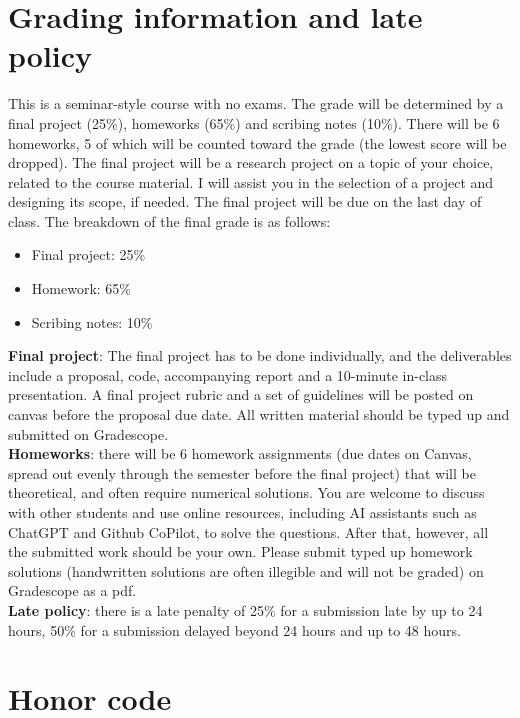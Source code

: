 \documentclass[12pt]{article}
\begin{document}
\section{Grading information and late policy}

This is a seminar-style course with no exams. The grade will be determined by a final project (25\%), homeworks (65\%) and scribing notes (10\%). There will be 6 homeworks, 5 of which will be counted toward the grade (the lowest score will be dropped). The final project will be a research project on a topic of your choice, related to the course material. I will assist you in the selection of a project and designing its scope, if needed. The final project will be due on the last day of class. The breakdown of the final grade is as follows:
\begin{itemize}
	\item Final project: 25\%
	\item Homework: 65\%
	\item Scribing notes: 10\%
\end{itemize}

\textbf{Final project}: The final project has to be done individually, and the deliverables include a proposal, code, accompanying report and a 10-minute in-class presentation. A final project rubric and a set of guidelines will be posted on canvas before the proposal due date. All written material should be typed up and submitted on Gradescope.\\

\textbf{Homeworks}: there will be 6 homework assignments (due dates on Canvas, spread out evenly through the semester before the final project) that will be theoretical, and often require numerical solutions. You are welcome to discuss with other students and use online resources, including AI assistants such as ChatGPT and Github CoPilot, to solve the questions. After that, however, all the submitted work should be your own. Please submit typed up homework solutions (handwritten solutions are often illegible and will not be graded) on Gradescope as a pdf. \\

\textbf{Late policy}: there is a late penalty of 25\% for a submission late by up to 24 hours, 50\% for a submission delayed beyond 24 hours and up to 48 hours. 

\section{Honor code}
\label{sec:honor}
\end{document}
